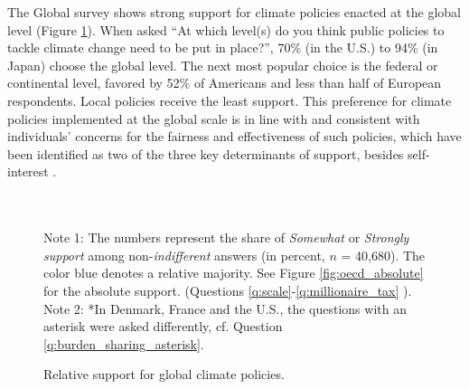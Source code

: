 The Global survey shows strong support for climate policies enacted at the global level (Figure \ref{fig:oecd}). %
When asked ``At which level(s) do you think public policies to tackle climate change need to be put in place?'', 70\% (in the U.S.) to 94\% (in Japan) choose the global level. The next most popular choice is the federal or continental level, favored by 52\% of Americans and less than half of European respondents. Local policies receive the least support. This preference for climate policies implemented at the global scale is in line with \citet{beiser-mcgrath_could_2019} and consistent with individuals' concerns for the fairness and effectiveness of such policies, which have been identified as two of the three key determinants of support, besides self-interest \citep{klenert_making_2018,douenne_yellow_2022,dechezlepretre_fighting_2022}.


\begin{figure}[h!]
  \caption[Relative support for global climate policies]{Relative support for global climate policies.} 
  \label{fig:oecd} %
  {\footnotesize \\ $\quad$ \\ Note 1: The numbers represent the share of \textit{Somewhat} or \textit{Strongly support} among non-\textit{indifferent} answers (in percent, $n$ = 40,680). The color blue denotes a relative majority. See Figure \ref{fig:oecd_absolute} for the absolute support. (Questions \ref{q:scale}-\ref{q:millionaire_tax}%
). \\ Note 2: *In Denmark, France and the U.S., the questions with an asterisk were asked differently, cf. Question \ref{q:burden_sharing_asterisk}. } 
\end{figure}


